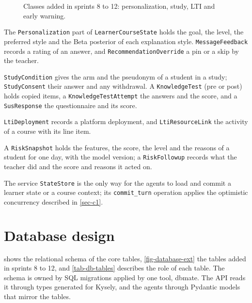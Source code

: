 \begin{figure}[htbp]
  \centering
  \caption{Classes added in sprints 8 to 12: personalization, study, LTI and early warning.}
  \label{fig-class-diagram-ext}
\end{figure}

\begin{description}[style=nextline, leftmargin=0.6cm]
  \item[Personalization] The \texttt{Personalization} part of
    \texttt{LearnerCourseState} holds the goal, the level, the preferred
    style and the Beta posterior of each explanation style.
    \texttt{MessageFeedback} records a rating of an answer, and
    \texttt{RecommendationOverride} a pin or a skip by the teacher.
  \item[Study] \texttt{StudyCondition} gives the arm and the pseudonym of
    a student in a study; \texttt{StudyConsent} their answer and any
    withdrawal. A \texttt{KnowledgeTest} (pre or post) holds copied items,
    a \texttt{KnowledgeTestAttempt} the answers and the score, and a
    \texttt{SusResponse} the questionnaire and its score.
  \item[LTI] \texttt{LtiDeployment} records a platform deployment, and
    \texttt{LtiResourceLink} the activity of a course with its line item.
  \item[Early warning] A \texttt{RiskSnapshot} holds the features, the
    score, the level and the reasons of a student for one day, with the
    model version; a \texttt{RiskFollowup} records what the teacher did
    and the score and reasons it acted on.
\end{description}
The \guillemotleft service\guillemotright{} \texttt{StateStore} is the only
way for the agents to load and commit a learner state or a course
context; its \texttt{commit\_turn} operation applies the optimistic
concurrency described in \cref{sec-c1}.

\section{Database design}
\label{sec-d-db}

 shows the relational schema of the core tables, \cref{fig-database-ext}
the tables added in sprints 8 to 12, and \cref{tab-db-tables}
describes the role of each table. The schema is owned by SQL migrations
applied by one tool, dbmate. The API reads it through types generated for
Kysely, and the agents through Pydantic models that mirror the tables.

